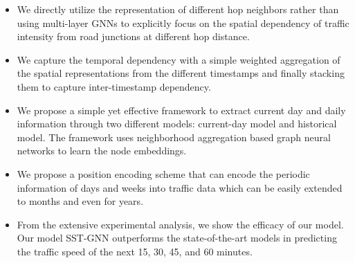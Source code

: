 \documentclass[runningheads]{llncs}
\begin{document}
\begin{itemize}

\item We directly utilize the representation of different hop neighbors rather than using multi-layer GNNs to explicitly focus on  the spatial dependency of traffic intensity from road junctions at different hop distance.

\item We capture the temporal dependency with a simple weighted aggregation of the spatial representations from the different timestamps and finally stacking them to capture inter-timestamp dependency.

\item  We propose a simple yet effective framework to extract current day and daily information through two different models: current-day model and historical model. The framework uses neighborhood aggregation based graph neural networks to learn the node embeddings. 


\item We propose a position encoding scheme that can encode the periodic information of days and weeks into traffic data which can be easily extended to months and even for years.

\item From the extensive experimental analysis, we show the efficacy of our model. Our model SST-GNN outperforms the state-of-the-art models in predicting the traffic speed of the next 15, 30, 45, and 60 minutes.
\end{itemize}
\end{document}
